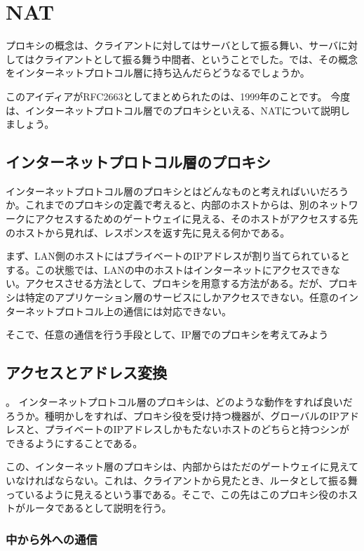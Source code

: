 \chapter{NAT}
プロキシの概念は、クライアントに対してはサーバとして振る舞い、サーバに対してはクライアントとして振る舞う中間者、ということでした。では、その概念をインターネットプロトコル層に持ち込んだらどうなるでしょうか。

このアイディアがRFC2663としてまとめられたのは、1999年のことです。
今度は、インターネットプロトコル層でのプロキシといえる、NATについて説明しましょう。

\section{インターネットプロトコル層のプロキシ}
インターネットプロトコル層のプロキシとはどんなものと考えればいいだろうか。これまでのプロキシの定義で考えると、内部のホストからは、別のネットワークにアクセスするためのゲートウェイに見える、そのホストがアクセスする先のホストから見れば、レスポンスを返す先に見える何かである。

まず、LAN側のホストにはプライベートのIPアドレスが割り当てられているとする。この状態では、LANの中のホストはインターネットにアクセスできない。アクセスさせる方法として、プロキシを用意する方法がある。だが、プロキシは特定のアプリケーション層のサービスにしかアクセスできない。任意のインターネットプロトコル上の通信には対応できない。

そこで、任意の通信を行う手段として、IP層でのプロキシを考えてみよう

\section{アクセスとアドレス変換}。
インターネットプロトコル層のプロキシは、どのような動作をすれば良いだろうか。種明かしをすれば、プロキシ役を受け持つ機器が、グローバルのIPアドレスと、プライベートのIPアドレスしかもたないホストのどちらと持つシンができるようにすることである。

この、インターネット層のプロキシは、内部からはただのゲートウェイに見えていなければならない。これは、クライアントから見たとき、ルータとして振る舞っているように見えるという事である。そこで、この先はこのプロキシ役のホストがルータであるとして説明を行う。

\subsection{中から外への通信}

